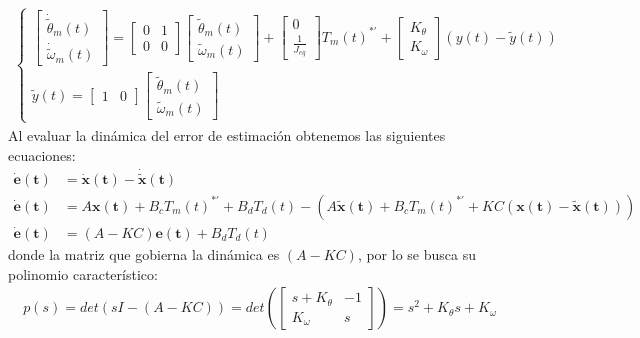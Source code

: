 \documentclass[a4paper, 10pt, onecolumn,journal]{ieeeconf}
\begin{document}
\begin{align}
	\begin{cases}
		\begin{bmatrix}
			\dot{\tilde{\theta}}_m(t) \\ 
			\dot{\tilde{\omega}}_m(t)
		\end{bmatrix} = 
		\begin{bmatrix}
			0 & 1 \\ 
			0 & 0
		\end{bmatrix}
		\begin{bmatrix}
			{\tilde{\theta}}_m(t) \\ 
			{\tilde{\omega}}_m(t)
		\end{bmatrix} + 
		\begin{bmatrix}
			0 \\ 
			\frac{1}{J_{eq}}
		\end{bmatrix} {T_m(t)}^{*'} + 
		\begin{bmatrix}
			K_{\theta} \\
			K_{\omega}
		\end{bmatrix} \left(y(t) - \tilde{y}(t) \right) \\
		\tilde{y}(t) = \begin{bmatrix}
			1 & 0
		\end{bmatrix} 
		\begin{bmatrix}
			{\tilde{\theta}}_m(t) \\ 
			{\tilde{\omega}}_m(t)
		\end{bmatrix}
	\end{cases}\label{ecuacion matricial de subsistema mecanico compensado}
\end{align}
Al evaluar la dinámica del error de estimación obtenemos las siguientes ecuaciones: 
\begin{align}
	{\mathbf{\dot e(t)}} &= \mathbf{\dot x(t)} - \mathbf{\dot{\tilde{x}} (t)}\\
	{\mathbf{\dot e(t)}} &= A {\mathbf{x(t)}} + B_c {T_m(t)}^{*'} + B_d T_d(t) - \left( A \mathbf{\tilde{x} (t)} + B_c {T_m(t)}^{*'} + K C \left(\mathbf{x(t)} - \mathbf{\tilde{x} (t)} \right) \right) \\
	{\mathbf{\dot e(t)}} &= \left(A - KC \right) {\mathbf{e(t)}} + B_d T_d(t)\label{dinamica del error de estimacion}
\end{align}
donde la matriz que gobierna la dinámica es $\left(A - KC \right)$, por lo se busca su polinomio característico:
\begin{align}
	p(s) = det\left(s I - \left( A - KC\right)  \right) = det\left(\begin{bmatrix}
		s + K_{\theta} & -1 \\ 
		K_{\omega} & s
	\end{bmatrix}  
	 \right) = s^2 + K_{\theta} s + K_{\omega} \label{polinomeo caracteristico de observador}
\end{align}
\end{document}
